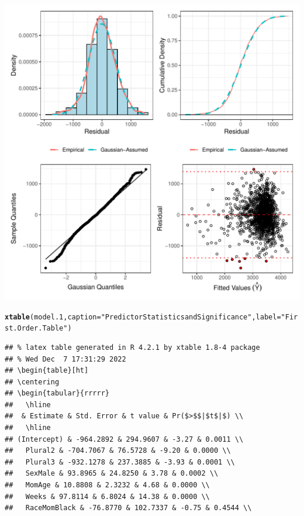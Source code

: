 \documentclass{article}\usepackage[]{graphicx}\usepackage[]{xcolor}
\makeatletter
\def\maxwidth{ %
  \ifdim\Gin@nat@width>\linewidth
    \linewidth
  \else
    \Gin@nat@width
  \fi
}
\newcommand{\hlstr}[1]{\textcolor[rgb]{0.192,0.494,0.8}{#1}}%
\newcommand{\hlstd}[1]{\textcolor[rgb]{0.345,0.345,0.345}{#1}}%
\newcommand{\hlkwc}[1]{\textcolor[rgb]{0.333,0.667,0.333}{#1}}%
\newcommand{\hlkwd}[1]{\textcolor[rgb]{0.737,0.353,0.396}{\textbf{#1}}}%
\newenvironment{kframe}{%
 \def\at@end@of@kframe{}%
 \ifinner\ifhmode%
  \def\at@end@of@kframe{\end{minipage}}%
  \begin{minipage}{\columnwidth}%
 \fi\fi%
 \def\FrameCommand##1{\hskip\@totalleftmargin \hskip-\fboxsep
 \colorbox{shadecolor}{##1}\hskip-\fboxsep
     \hskip-\linewidth \hskip-\@totalleftmargin \hskip\columnwidth}%
 \MakeFramed {\advance\hsize-\width
   \@totalleftmargin\z@ \linewidth\hsize
   \@setminipage}}%
 {\par\unskip\endMakeFramed%
 \at@end@of@kframe}
\newenvironment{knitrout}{}{} %
\makeatother
\begin{document}
\begin{knitrout}
\includegraphics[width=\maxwidth]{figure/unnamed-chunk-9-1} 
\begin{kframe}\begin{alltt}
\hlkwd{xtable}\hlstd{(model.1,} \hlkwc{caption}\hlstd{=}\hlstr{"Predictor Statistics and Significance"}\hlstd{,} \hlkwc{label}\hlstd{=}\hlstr{"First.Order.Table"}\hlstd{)}
\end{alltt}
\begin{verbatim}
## % latex table generated in R 4.2.1 by xtable 1.8-4 package
## % Wed Dec  7 17:31:29 2022
## \begin{table}[ht]
## \centering
## \begin{tabular}{rrrrr}
##   \hline
##  & Estimate & Std. Error & t value & Pr($>$$|$t$|$) \\ 
##   \hline
## (Intercept) & -964.2892 & 294.9607 & -3.27 & 0.0011 \\ 
##   Plural2 & -704.7067 & 76.5728 & -9.20 & 0.0000 \\ 
##   Plural3 & -932.1278 & 237.3885 & -3.93 & 0.0001 \\ 
##   SexMale & 93.8965 & 24.8250 & 3.78 & 0.0002 \\ 
##   MomAge & 10.8808 & 2.3232 & 4.68 & 0.0000 \\ 
##   Weeks & 97.8114 & 6.8024 & 14.38 & 0.0000 \\ 
##   RaceMomBlack & -76.8770 & 102.7337 & -0.75 & 0.4544 \\ 

\end{verbatim}
\end{kframe}
\end{knitrout}
\end{document}
